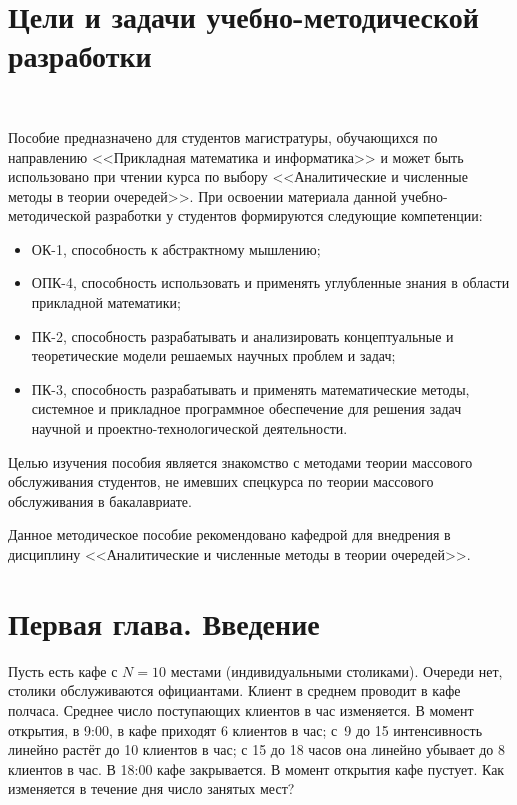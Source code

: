 \documentclass[12pt]{extarticle}
\begin{document}
\section{Цели и задачи учебно-методической разработки}
\
\thispagestyle{empty}



Пособие предназначено для студентов магистратуры, обучающихся по
направлению <<Прикладная математика и информатика>> и
может быть использовано при чтении  курса по выбору <<Аналитические и численные методы в теории очередей>>. При освоении материала данной учебно-методической разработки у студентов формируются следующие компетенции:
\begin{itemize}
\item ОК-1, способность к абстрактному мышлению;
\item ОПК-4, способность использовать и применять углубленные знания в области прикладной математики;
\item ПК-2, способность разрабатывать и анализировать концептуальные и теоретические модели решаемых научных проблем и задач;
\item ПК-3, способность разрабатывать и применять математические методы, системное и прикладное программное обеспечение для решения задач научной и проектно-технологической деятельности.
\end{itemize}
Целью изучения пособия является знакомство с методами теории массового обслуживания студентов, не имевших спецкурса по теории массового обслуживания в бакалавриате.

Данное методическое пособие рекомендовано кафедрой для внедрения в дисциплину <<Аналитические и численные методы в теории очередей>>.


\newpage




\newpage
\section{Первая глава. Введение}

Пусть есть кафе с $N=10$ местами (индивидуальными столиками). Очереди нет,
столики обслуживаются официантами. Клиент в среднем
проводит в кафе полчаса. Среднее число поступающих клиентов в час изменяется. В
момент открытия, в 9:00, в кафе приходят 6 клиентов в час; с~9 до 15 интенсивность
линейно растёт до 10 клиентов в час; с 15 до 18 часов она линейно убывает до 8
клиентов в час. В 18:00 кафе закрывается. В момент открытия кафе пустует. Как
изменяется в течение дня число занятых мест?
\end{document}
